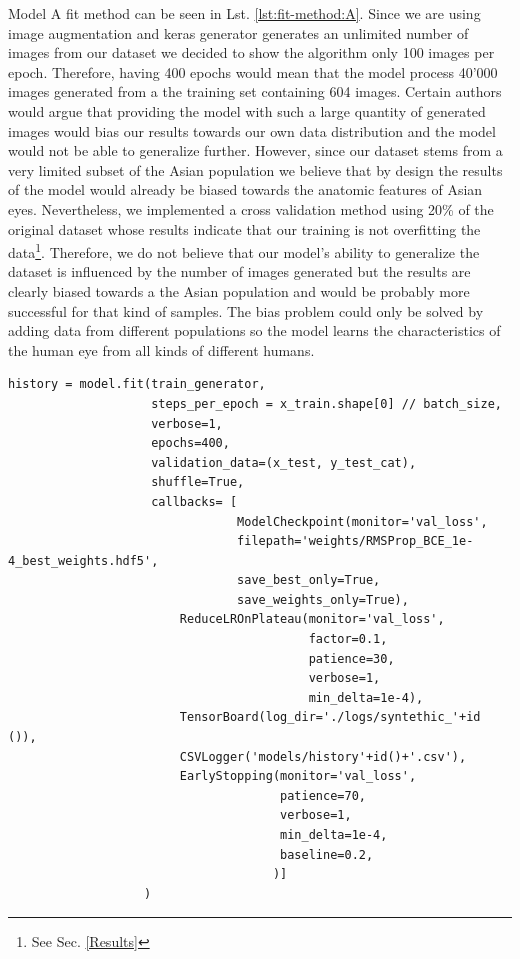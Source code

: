 \documentclass[12pt,a4paper]{scrartcl}
\begin{document}
Model A fit method can be seen in Lst. \ref{lst:fit-method:A}. Since we are using image augmentation and keras generator generates an unlimited number of images from our dataset we decided to show the algorithm only 100 images per epoch. Therefore, having 400 epochs would mean that the model process 40'000 images generated from a the training set containing 604 images. Certain authors \cite{Shorten2019, mikolajcyk2018} would argue that providing the model with such a large quantity of generated images would bias our results towards our own data distribution and the model would not be able to generalize further. However, since our dataset stems from a very limited subset of the Asian population we believe that by design the results of the model would already be biased towards the anatomic features of Asian eyes. Nevertheless, we implemented a cross validation method using 20\% of the original dataset whose results indicate that our training is not overfitting the data\footnote{See Sec. \ref{Results}}. Therefore, we do not believe that our model's ability to generalize the dataset is influenced by the number of images generated but the results are clearly biased towards a the Asian population and would be probably more successful for that kind of samples. The bias problem could only be solved by adding data from different populations so the model learns the characteristics of the human eye from all kinds of different humans. 

\begin{lstlisting}[caption={Model A training parameters, this is a code snippet from the  \emph{train\_model\_A} method in \emph{train.py}}, label={lst:fit-method:A}]
history = model.fit(train_generator,
                    steps_per_epoch = x_train.shape[0] // batch_size,
                    verbose=1, 
                    epochs=400, 
                    validation_data=(x_test, y_test_cat),
                    shuffle=True,
                    callbacks= [
                                ModelCheckpoint(monitor='val_loss',
                                filepath='weights/RMSProp_BCE_1e-4_best_weights.hdf5',
                                save_best_only=True,
                                save_weights_only=True),
                        ReduceLROnPlateau(monitor='val_loss',
                                          factor=0.1,
                                          patience=30,
                                          verbose=1,
                                          min_delta=1e-4),
                        TensorBoard(log_dir='./logs/syntethic_'+id ()),
                        CSVLogger('models/history'+id()+'.csv'),
                        EarlyStopping(monitor='val_loss',
                                      patience=70,
                                      verbose=1,
                                      min_delta=1e-4,
                                      baseline=0.2,
                                     )]
                   )
\end{lstlisting}
\end{document}
